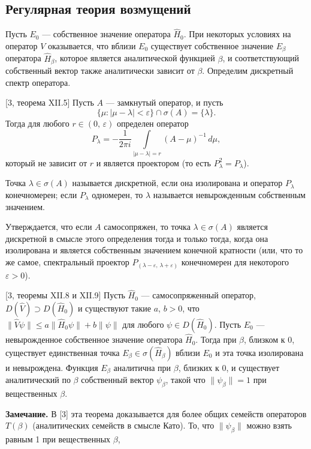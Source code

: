 \documentclass[a4paper
]{article}
\begin{document}
\subsection{Регулярная теория возмущений}
Пусть $E_0$ --- собственное значение оператора $\hat H_0$. При некоторых
условиях на оператор $V$ оказывается, что вблизи $E_0$ существует
собственное значение $E_\beta$ оператора $\hat H_\beta$, которое является
аналитической функцией $\beta$, и соответствующий собственный вектор
также аналитически зависит от $\beta$. Определим дискретный спектр оператора.
\begin{Trm}
{\rm [3, теорема XII.5]}
Пусть $A$ --- замкнутый оператор, и пусть $$\{\mu:|\mu-\lambda|<\varepsilon\}
\cap \sigma(A)=\{\lambda\}.$$ Тогда для любого $r\in (0, \, \varepsilon)$
определен оператор $$P_\lambda=-\frac{1}{2\pi i}\int \limits_{|\mu-\lambda|
=r}(A-\mu)^{-1}\, d\mu,$$ который не зависит от $r$ и является проектором
(то есть $P_\lambda^2=P_\lambda$).
\end{Trm}
\begin{Def}
Точка $\lambda\in \sigma(A)$ называется дискретной, если она изолирована и
оператор $P_\lambda$ конечномерен; если $P_\lambda$ одномерен, то $\lambda$
называется невырожденным собственным значением.
\end{Def}
Утверждается, что если $A$ самосопряжен, то точка $\lambda\in \sigma(A)$
является дискретной в смысле этого определения тогда и только тогда, когда
она изолирована и является собственным значением конечной кратности
(или, что то же самое, спектральный проектор $P_{(\lambda-\varepsilon, \,
\lambda+\varepsilon)}$ конечномерен для некоторого $\varepsilon>0$).
\begin{Trm}
\label{regul_teor_vozm}
{\rm [3, теоремы XII.8 и XII.9]}
Пусть $\hat H_0$ --- самосопряженный оператор, $D(\hat V)\supset D(\hat
H_0)$ и существуют такие $a$, $b>0$, что $\|\hat V\psi\|\le a\|\hat H_0
\psi\|+b\|\psi\|$ для любого $\psi\in D(\hat H_0)$. Пусть $E_0$ ---
невырожденное собственное значение оператора $\hat H_0$. Тогда при
$\beta$, близком к 0, существует единственная точка $E_\beta\in \sigma
(\hat H_\beta)$ вблизи $E_0$ и эта точка изолирована и невырождена.
Функция $E_\beta$ аналитична при $\beta$, близких к 0, и существует
аналитический по $\beta$ собственный вектор $\psi_\beta$, такой что $\|\psi_\beta\|
=1$ при вещественных $\beta$.
\end{Trm}
{\bf Замечание.} В [3] эта теорема доказывается для более
общих семейств операторов $T(\beta)$ (аналитических семейств в смысле Като).
То, что $\|\psi_\beta\|$ можно взять равным 1 при вещественных $\beta$,
\end{document}
